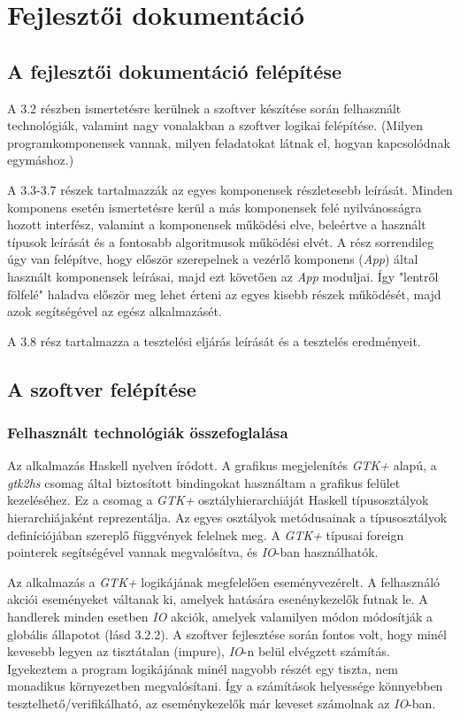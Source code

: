 \chapter{Fejlesztői dokumentáció} %
\label{ch:impl}

\section{A fejlesztői dokumentáció felépítése}

A 3.2 részben ismertetésre kerülnek a szoftver készítése során felhasznált technológiák, valamint nagy vonalakban a szoftver logikai felépítése. (Milyen programkomponensek vannak, milyen feladatokat látnak el, hogyan kapcsolódnak egymáshoz.) 

A 3.3-3.7 részek tartalmazzák az egyes komponensek részletesebb leírását. Minden komponens esetén ismertetésre kerül a más komponensek felé nyilvánosságra hozott interfész, valamint a komponensek működési elve, beleértve a használt típusok leírását és a fontosabb algoritmusok működési elvét. A rész sorrendileg úgy van felépítve, hogy először szerepelnek a vezérlő komponens (\textit{App}) által használt komponensek leírásai, majd ezt követően az \textit{App} moduljai. Így "lentről fölfelé" haladva először meg lehet érteni az egyes kisebb részek működését, majd azok segítségével az egész alkalmazásét.

A 3.8 rész tartalmazza a tesztelési eljárás leírását és a tesztelés eredményeit. 

\section{A szoftver felépítése}

\subsection{Felhasznált technológiák összefoglalása}

Az alkalmazás Haskell nyelven íródott. A grafikus megjelenítés \textit{GTK+} alapú, a \textit{gtk2hs} csomag által biztosított bindingokat használtam a grafikus felület kezeléséhez. Ez a csomag a \textit{GTK+} osztályhierarchiáját Haskell típusosztályok hierarchiájaként reprezentálja. Az egyes osztályok metódusainak a típusosztályok definíciójában szereplő függvények felelnek meg. A \textit{GTK+} típusai foreign pointerek segítségével vannak megvalósítva, és \textit{IO}-ban használhatók. 

Az alkalmazás a \textit{GTK+} logikájának megfelelően eseményvezérelt. A felhasználó akciói eseményeket váltanak ki, amelyek hatására esenénykezelők futnak le. A handlerek minden esetben \textit{IO} akciók, amelyek valamilyen módon módosítják a globális állapotot (lásd 3.2.2). A szoftver fejlesztése során fontos volt, hogy minél kevesebb legyen az tisztátalan (impure), \textit{IO}-n belül elvégzett számítás. Igyekeztem a program logikájának minél nagyobb részét egy tiszta, nem monadikus környezetben megvalósítani. Így a számítások helyessége könnyebben tesztelhető/verifikálható, az eseménykezelők már keveset számolnak az \textit{IO}-ban.

